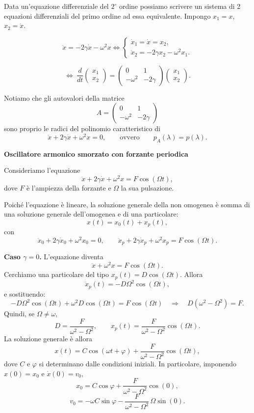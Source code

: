 \begin{oss}{}
Data un'equazione differenziale del \(2^\circ\) ordine possiamo scrivere un sistema di 2 equazioni differenziali del primo ordine ad essa equivalente. Impongo \(x_1=x\), \(x_2=\dot x\).

\[
\ddot x=-2\gamma \dot x-\omega^2 x
\iff
\begin{cases}
\dot x_1=\dot x=x_2,\\
\dot x_2=-2\gamma x_2-\omega^2 x_1.
\end{cases}
\]

\[
\iff\
\frac{d}{dt}
\begin{pmatrix}
x_1\\
x_2
\end{pmatrix}
=
\begin{pmatrix}
0 & 1\\
-\omega^2 & -2\gamma
\end{pmatrix}
\begin{pmatrix}
x_1\\
x_2
\end{pmatrix}.
\]

Notiamo che gli autovalori della matrice
\[
A=
\begin{pmatrix}
0 & 1\\
-\omega^2 & -2\gamma
\end{pmatrix}
\]
sono proprio le radici del polinomio caratteristico di
\[
\ddot x+2\gamma \dot x+\omega^2 x=0,
\qquad\text{ovvero}\qquad
p_A(\lambda)=p(\lambda).
\]
\end{oss}

\textbf{Oscillatore armonico smorzato con forzante periodica}

Consideriamo l’equazione
\[
\ddot{x}+2\gamma \dot{x}+\omega^2 x = F\cos(\Omega t),
\]
dove \(F\) è l’ampiezza della forzante e \(\Omega\) la sua pulsazione.

Poiché l’equazione è lineare, la soluzione generale della non omogenea è somma di una soluzione generale dell’omogenea e di una particolare:
\[
x(t)=x_0(t)+x_p(t),
\]
con
\[
\ddot{x}_0+2\gamma \dot{x}_0+\omega^2 x_0=0,
\qquad
\ddot{x}_p+2\gamma \dot{x}_p+\omega^2 x_p=F\cos(\Omega t).
\]

\medskip
\textbf{Caso \(\gamma=0\).}
L’equazione diventa
\[
\ddot{x}+\omega^2 x = F\cos(\Omega t).
\]
Cerchiamo una particolare del tipo \(x_p(t)=D\cos(\Omega t)\). Allora
\[
\ddot{x}_p(t)=-D\Omega^2\cos(\Omega t),
\]
e sostituendo:
\[
-D\Omega^2\cos(\Omega t)+\omega^2 D\cos(\Omega t)=F\cos(\Omega t)
\quad\Rightarrow\quad
D(\omega^2-\Omega^2)=F.
\]
Quindi, se \(\Omega\neq\omega\),
\[
D=\frac{F}{\omega^2-\Omega^2},
\qquad
x_p(t)=\frac{F}{\omega^2-\Omega^2}\cos(\Omega t).
\]
La soluzione generale è allora
\[
x(t)=C\cos(\omega t+\varphi)+\frac{F}{\omega^2-\Omega^2}\cos(\Omega t),
\]
dove \(C\) e \(\varphi\) si determinano dalle condizioni iniziali. In particolare, imponendo
\(x(0)=x_0\) e \(\dot{x}(0)=v_0\),
\[
x_0=C\cos\varphi+\frac{F}{\omega^2-\Omega^2}\cos(0),
\]
\[
v_0=-\omega C\sin\varphi-\frac{F}{\omega^2-\Omega^2}\,\Omega\sin(0).
\]

